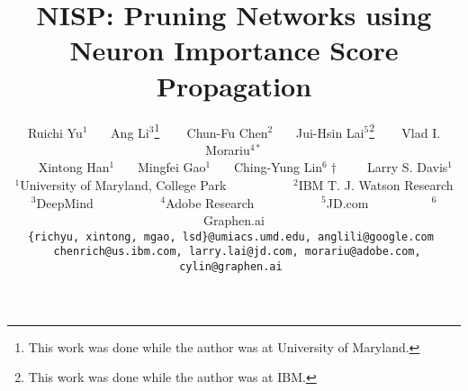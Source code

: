 \documentclass[10pt,twocolumn,letterpaper]{article}
\begin{document}
\title{NISP: Pruning Networks using Neuron Importance Score Propagation}




\author{Ruichi Yu$^{1}$ ~~~Ang  Li$^3$\thanks{This work was done while the author was at University of Maryland.}
~~~ Chun-Fu Chen$^2$~~~ Jui-Hsin Lai$^5$\thanks{This work was done while the author was at IBM.}  ~~~ Vlad I. Morariu$^{4*}$ \\
~~~ Xintong Han$^1$~~~ Mingfei Gao$^1$ ~~~Ching-Yung Lin$^6\dag$ ~~~ Larry S. Davis$^1$\\
$^1$University of Maryland, College Park ~~~~~~~~~~$^2$IBM T. J. Watson Research  \\
$^3$DeepMind  ~~~~~~~~~~$^4$Adobe Research ~~~~~~~~~~$^5$JD.com~~~~~~~~~~$^6$Graphen.ai\\
{\tt\small {\{richyu, xintong, mgao, lsd\}@umiacs.umd.edu}, anglili@google.com
}
\\
{\tt\small { chenrich@us.ibm.com}, larry.lai@jd.com, morariu@adobe.com, cylin@graphen.ai
}
}

\maketitle
\end{document}
